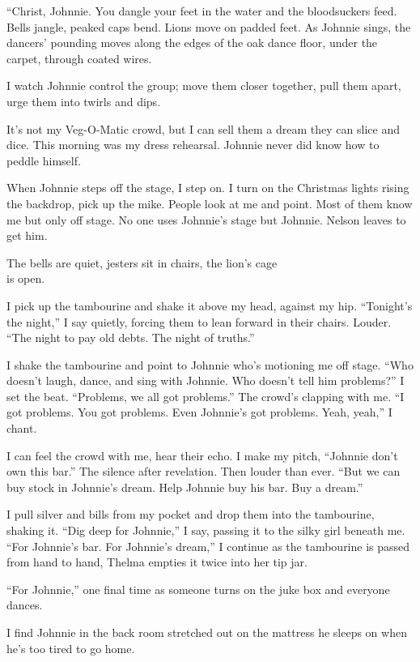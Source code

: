 \documentclass[twoside,10pt]{book}
\begin{document}
``Christ, Johnnie. You dangle your feet in the water and the
bloodsuckers feed.\\
Bells jangle, peaked caps bend. Lions move on padded feet. As Johnnie
sings, the dancers' pounding moves along the edges of the oak dance
floor, under the carpet, through coated wires.

I watch Johnnie control the group; move them closer together, pull them
apart, urge them into twirls and dips.

It's not my Veg-O-Matic crowd, but I can sell them a dream they can
slice and dice. This morning was my dress rehearsal. Johnnie never did
know how to peddle himself.

When Johnnie steps off the stage, I step on. I turn on the Christmas
lights rising the backdrop, pick up the mike. People look at me and
point. Most of them know me but only off stage. No one uses Johnnie's
stage but Johnnie. Nelson leaves to get him.

The bells are quiet, jesters sit in chairs, the lion's cage\\
is open.

I pick up the tambourine and shake it above my head, against my hip.
``Tonight's the night,'' I say quietly, forcing them to lean forward in
their chairs. Louder. ``The night to pay old debts. The night of
truths.''

I shake the tambourine and point to Johnnie who's motioning me off
stage. ``Who doesn't laugh, dance, and sing with Johnnie. Who doesn't
tell him problems?'' I set the beat. ``Problems, we all got problems.''
The crowd's clapping with me. ``I got problems. You got problems. Even
Johnnie's got problems. Yeah, yeah,'' I chant.

I can feel the crowd with me, hear their echo. I make my pitch,
``Johnnie don't own this bar.'' The silence after revelation. Then
louder than ever. ``But we can buy stock in Johnnie's dream. Help
Johnnie buy his bar. Buy a dream.''

I pull silver and bills from my pocket and drop them into the
tambourine, shaking it. ``Dig deep for Johnnie,'' I say, passing it to
the silky girl beneath me. ``For Johnnie's bar. For Johnnie's dream,'' I
continue as the tambourine is passed from hand to hand, Thelma empties
it twice into her tip jar.

``For Johnnie,'' one final time as someone turns on the juke box and
everyone dances.

I find Johnnie in the back room stretched out on the mattress he sleeps
on when he's too tired to go home.
\end{document}
